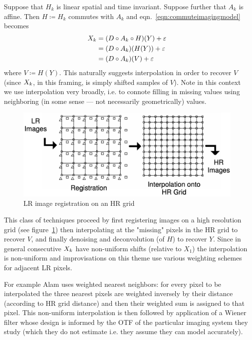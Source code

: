 Suppose that $H_k$ is linear spatial and time invariant.
%
Suppose further that $A_k$ is affine.
%
Then $H \coloneqq H_k$ commutes with $A_k$\cite{meladcommute} and eqn.~\eqref{eqn:commuteimagingmodel} becomes
\begin{equation}
    \label{eqn:commuteimagingmodel}
    \begin{split}
        \Xk &= (D \circ A_k \circ H) (Y) + \varepsilon \\
        &= (D \circ A_k) (H(Y)) + \varepsilon \\
        &= (D \circ A_k) (V) + \varepsilon
    \end{split}
\end{equation}
%
where $V \coloneqq H(Y)$.
%
This naturally suggests interpolation in order to recover $V$ (since $X_k$, in this framing, is simply shifted samples of $V$).
%
Note in this context we use interpolation very broadly, i.e. to connote filling in missing values using neighboring (in some sense --- not necessarily geometrically) values.
%
\begin{figure}
    \centering
    \includegraphics[width=\linewidth,keepaspectratio]{figures/hrgrid.png}
    \caption{LR image registration on an HR grid\cite{Lin}}
    \label{fig:hrgrid}
\end{figure}
This class of techniques proceed by first registering images on a high resolution grid (see figure~\ref{fig:hrgrid}) then interpolating at the "missing" pixels in the HR grid to recover $V$, and finally denoising and deconvolution (of $H$) to recover $Y$.
%
Since in general consecutive $X_k$ have non-uniform shifts (relative to $X_1$) the interpolation is non-uniform and improvisations on this theme use various weighting schemes for adjacent LR pixels.

For example Alam \cite{Alam2000} uses weighted nearest neighbors: for every pixel to be interpolated the three nearest pixels are weighted inversely by their distance (according to HR grid distance) and then their weighted sum is assigned to that pixel.
%
This non-uniform interpolation is then followed by application of a Wiener filter whose design is informed by the OTF of the particular imaging system they study (which they do not estimate i.e. they assume they can model accurately).
%
